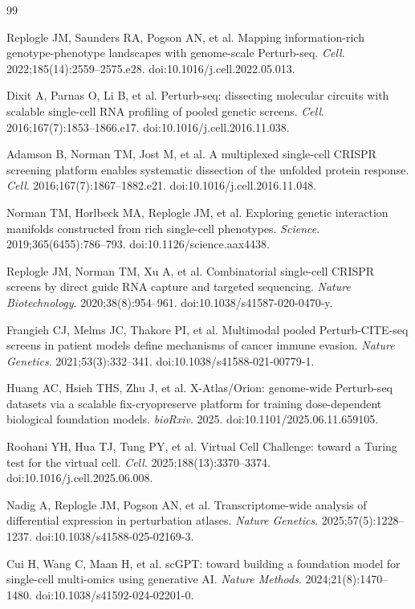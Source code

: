 \documentclass[12pt]{article}
\begin{document}
\begin{singlespace}
\begin{thebibliography}{99}

 Replogle JM, Saunders RA, Pogson AN, et al. Mapping information-rich genotype-phenotype landscapes with genome-scale Perturb-seq. \textit{Cell}. 2022;185(14):2559–2575.e28. doi:10.1016/j.cell.2022.05.013.

 Dixit A, Parnas O, Li B, et al. Perturb-seq: dissecting molecular circuits with scalable single-cell RNA profiling of pooled genetic screens. \textit{Cell}. 2016;167(7):1853–1866.e17. doi:10.1016/j.cell.2016.11.038.

 Adamson B, Norman TM, Jost M, et al. A multiplexed single-cell CRISPR screening platform enables systematic dissection of the unfolded protein response. \textit{Cell}. 2016;167(7):1867–1882.e21. doi:10.1016/j.cell.2016.11.048.

 Norman TM, Horlbeck MA, Replogle JM, et al. Exploring genetic interaction manifolds constructed from rich single-cell phenotypes. \textit{Science}. 2019;365(6455):786–793. doi:10.1126/science.aax4438.

 Replogle JM, Norman TM, Xu A, et al. Combinatorial single-cell CRISPR screens by direct guide RNA capture and targeted sequencing. \textit{Nature Biotechnology}. 2020;38(8):954–961. doi:10.1038/s41587-020-0470-y.

 Frangieh CJ, Melms JC, Thakore PI, et al. Multimodal pooled Perturb-CITE-seq screens in patient models define mechanisms of cancer immune evasion. \textit{Nature Genetics}. 2021;53(3):332–341. doi:10.1038/s41588-021-00779-1.

 Huang AC, Hsieh THS, Zhu J, et al. X-Atlas/Orion: genome-wide Perturb-seq datasets via a scalable fix-cryopreserve platform for training dose-dependent biological foundation models. \textit{bioRxiv}. 2025. doi:10.1101/2025.06.11.659105.

 Roohani YH, Hua TJ, Tung PY, et al. Virtual Cell Challenge: toward a Turing test for the virtual cell. \textit{Cell}. 2025;188(13):3370–3374. doi:10.1016/j.cell.2025.06.008.

 Nadig A, Replogle JM, Pogson AN, et al. Transcriptome-wide analysis of differential expression in perturbation atlases. \textit{Nature Genetics}. 2025;57(5):1228–1237. doi:10.1038/s41588-025-02169-3.

 Cui H, Wang C, Maan H, et al. scGPT: toward building a foundation model for single-cell multi-omics using generative AI. \textit{Nature Methods}. 2024;21(8):1470–1480. doi:10.1038/s41592-024-02201-0.


\end{thebibliography}
\end{singlespace}
\end{document}

